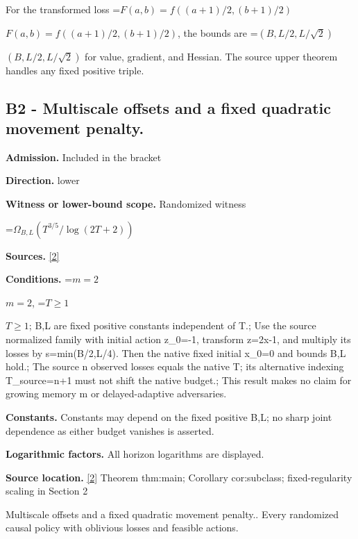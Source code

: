 \documentclass[10pt,a4paper]{article}
\newcommand{\AtlasMath}[1]{\par\begingroup\centering\setbox0=\hbox{$\displaystyle #1$}\ifdim\wd0>1.4\linewidth\typeout{ATLAS WIDE FORMULA: \the\wd0}\fi\ifdim\wd0>\linewidth\resizebox{\linewidth}{!}{\box0}\else\box0\fi\par\endgroup}
\newcommand{\AtlasInlineMath}[1]{\begingroup\setbox0=\hbox{$#1$}\ifdim\wd0>.4\linewidth\endgroup\AtlasMath{#1}\else\endgroup$#1$\fi}
\begin{document}
For the transformed loss \AtlasInlineMath{F(a,b)=f((a+1)/2,(b+1)/2)}, the bounds are \AtlasInlineMath{(B,L/2,L/\sqrt2)} for value, gradient, and Hessian. The source upper theorem handles any fixed positive triple.



\subsection{B2 - Multiscale offsets and a fixed quadratic movement penalty.}


\textbf{Admission.} Included in the bracket



\textbf{Direction.} lower



\textbf{Witness or lower-bound scope.} Randomized witness



\AtlasMath{\Omega_{B,L}\!\left(T^{3/5}/\log(2T+2)\right)}


\textbf{Sources.} \href{https://github.com/WU-Wendao/Colombo/blob/main/colombo_sensorium/Complexity_altas/data/sources/colombo/Q5/manuscript.pdf}{[2]}



\textbf{Conditions.} \AtlasInlineMath{m=2}, \AtlasInlineMath{T\ge1}; B,L are fixed positive constants independent of T.; Use the source normalized family with initial action z\_0=-1, transform z=2x-1, and multiply its losses by s=min(B/2,L/4). Then the native fixed initial x\_0=0 and bounds B,L hold.; The source n observed losses equals the native T; its alternative indexing T\_source=n+1 must not shift the native budget.; This result makes no claim for growing memory m or delayed-adaptive adversaries.



\textbf{Constants.} Constants may depend on the fixed positive B,L; no sharp joint dependence as either budget vanishes is asserted.



\textbf{Logarithmic factors.} All horizon logarithms are displayed.



\textbf{Source location.} \href{https://github.com/WU-Wendao/Colombo/blob/main/colombo_sensorium/Complexity_altas/data/sources/colombo/Q5/manuscript.pdf}{[2]} Theorem thm:main; Corollary cor:subclass; fixed-regularity scaling in Section 2



Multiscale offsets and a fixed quadratic movement penalty.. Every randomized causal policy with oblivious losses and feasible actions.
\end{document}
